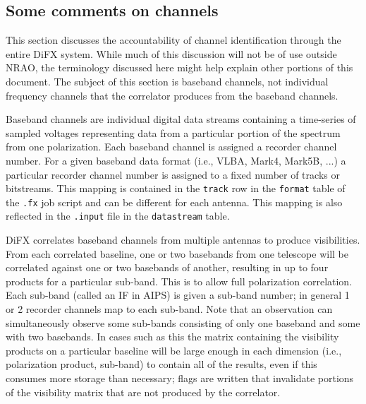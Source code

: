 \subsection{Some comments on channels}

This section discusses the accountability of channel identification through the entire DiFX system.
While much of this discussion will not be of use outside NRAO, the terminology discussed here might help explain other portions of this document.  
The subject of this section is baseband channels, not individual frequency channels that the correlator produces from
the baseband channels.

Baseband channels are individual digital data streams containing a time-series of sampled voltages representing data from a particular portion of the spectrum from one polarization.
Each baseband channel is assigned a recorder channel number.
For a given baseband data format (i.e., VLBA, Mark4, Mark5B, ...) a particular recorder channel number is assigned to a fixed number of tracks or bitstreams.
This mapping is contained in the {\tt track} row in the {\tt format} table of the {\tt .fx} job script and can be different for each antenna.
This mapping is also reflected in the {\tt .input} file in the {\tt datastream} table.

DiFX correlates baseband channels from multiple antennas to produce visibilities.
From each correlated baseline, one or two basebands from one telescope will be correlated against one or two basebands of another, resulting in up to four products for a particular sub-band.
This is to allow full polarization correlation.
Each sub-band (called an IF in AIPS) is given a sub-band number; in general 1 or 2 recorder channels map to each sub-band.
Note that an observation can simultaneously observe some sub-bands consisting of only one baseband and some with two basebands.
In cases such as this the matrix containing the visibility products on a particular baseline will be large enough in each dimension (i.e., polarization product, sub-band) to contain all of the results, even if this consumes more storage than necessary; flags are written that invalidate portions of the visibility matrix that are not produced by the correlator.  
